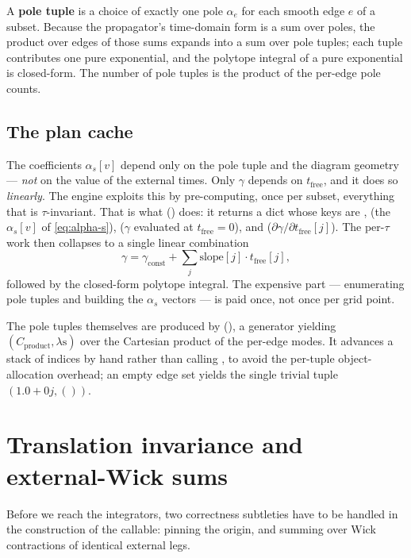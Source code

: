 \begin{defn}
A \textbf{pole tuple} is a choice of exactly one pole $\alpha_e$ for each smooth
edge $e$ of a subset. Because the propagator's time-domain form is a sum over
poles, the product over edges of those sums expands into a sum over pole tuples;
each tuple contributes one pure exponential, and the polytope integral of a pure
exponential is closed-form. The number of pole tuples is the product of the
per-edge pole counts.
\end{defn}

\subsection{The plan cache}

The coefficients $\alpha_s[v]$ depend only on the pole tuple and the diagram
geometry --- \emph{not} on the value of the external times. Only $\gamma$ depends
on $t_{\text{free}}$, and it does so \emph{linearly}. The engine exploits this by
pre-computing, once per subset, everything that is $\tau$-invariant. That is what
 () does: it
returns a dict whose keys are ,  (the
$\alpha_s[v]$ of \eqref{eq:alpha-s}),  ($\gamma$
evaluated at $t_{\text{free}}=0$), and 
($\partial\gamma/\partial t_{\text{free}}[j]$). The per-$\tau$ work then collapses
to a single linear combination
\[
  \gamma = \gamma_{\text{const}} + \sum_j \text{slope}[j]\cdot t_{\text{free}}[j],
\]
followed by the closed-form polytope integral. The expensive part --- enumerating
pole tuples and building the $\alpha_s$ vectors --- is paid once, not once per
grid point.

The pole tuples themselves are produced by 
(), a generator yielding $(C_{\text{product}},
\lambda\text{s})$ over the Cartesian product of the per-edge modes. It advances a
stack of indices by hand rather than calling , to avoid
the per-tuple object-allocation overhead; an empty edge set yields the single
trivial tuple $(1.0+0j, ())$.

\section{Translation invariance and external-Wick sums}\label{sec:wick}

Before we reach the integrators, two correctness subtleties have to be handled in
the construction of the callable: pinning the origin, and summing over Wick
contractions of identical external legs.

